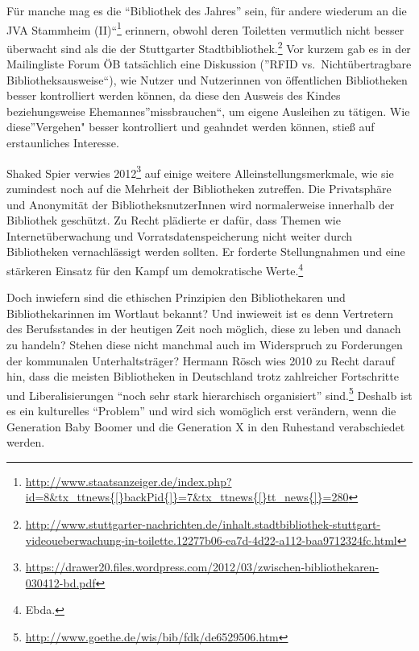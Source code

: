 \documentclass[a4paper,
fontsize=11pt,
oneside,
numbers=noperiodatend,
parskip=half-,
bibliography=totoc,
final
]{scrartcl}
\begin{document}
Für manche mag es die \enquote{Bibliothek des Jahres} sein, für andere
wiederum an die JVA Stammheim (II)\enquote{\footnote{\url{http://www.staatsanzeiger.de/index.php?id=8\&tx\_ttnews{[}backPid{]}=7\&tx\_ttnews{[}tt\_news{]}=280}}
erinnern, obwohl deren Toiletten vermutlich nicht besser überwacht sind
als die der Stuttgarter Stadtbibliothek.\footnote{\url{http://www.stuttgarter-nachrichten.de/inhalt.stadtbibliothek-stuttgart-videoueberwachung-in-toilette.12277b06-ea7d-4d22-a112-baa9712324fc.html}}
Vor kurzem gab es in der Mailingliste Forum ÖB tatsächlich eine
Diskussion (}RFID vs.~Nichtübertragbare Bibliotheksausweise\enquote{),
wie Nutzer und Nutzerinnen von öffentlichen Bibliotheken besser
kontrolliert werden können, da diese den Ausweis des Kindes
beziehungsweise Ehemannes}missbrauchen\enquote{, um eigene Ausleihen zu
tätigen. Wie diese}Vergehen" besser kontrolliert und geahndet werden
können, stieß auf erstaunliches Interesse.

Shaked Spier verwies 2012\footnote{\url{https://drawer20.files.wordpress.com/2012/03/zwischen-bibliothekaren-030412-bd.pdf}}
auf einige weitere Alleinstellungsmerkmale, wie sie zumindest noch auf
die Mehrheit der Bibliotheken zutreffen. Die Privatsphäre und Anonymität
der BibliotheksnutzerInnen wird normalerweise innerhalb der Bibliothek
geschützt. Zu Recht plädierte er dafür, dass Themen wie
Internetüberwachung und Vorratsdatenspeicherung nicht weiter durch
Bibliotheken vernachlässigt werden sollten. Er forderte Stellungnahmen
und eine stärkeren Einsatz für den Kampf um demokratische
Werte.\footnote{Ebda.}

Doch inwiefern sind die ethischen Prinzipien den Bibliothekaren und
Bibliothekarinnen im Wortlaut bekannt? Und inwieweit ist es denn
Vertretern des Berufsstandes in der heutigen Zeit noch möglich, diese zu
leben und danach zu handeln? Stehen diese nicht manchmal auch im
Widerspruch zu Forderungen der kommunalen Unterhaltsträger? Hermann
Rösch wies 2010 zu Recht darauf hin, dass die meisten Bibliotheken in
Deutschland trotz zahlreicher Fortschritte und Liberalisierungen
\enquote{noch sehr stark hierarchisch organisiert} sind.\footnote{\url{http://www.goethe.de/wis/bib/fdk/de6529506.htm}}
Deshalb ist es ein kulturelles \enquote{Problem} und wird sich womöglich
erst verändern, wenn die Generation Baby Boomer und die Generation X in
den Ruhestand verabschiedet werden.
\end{document}
